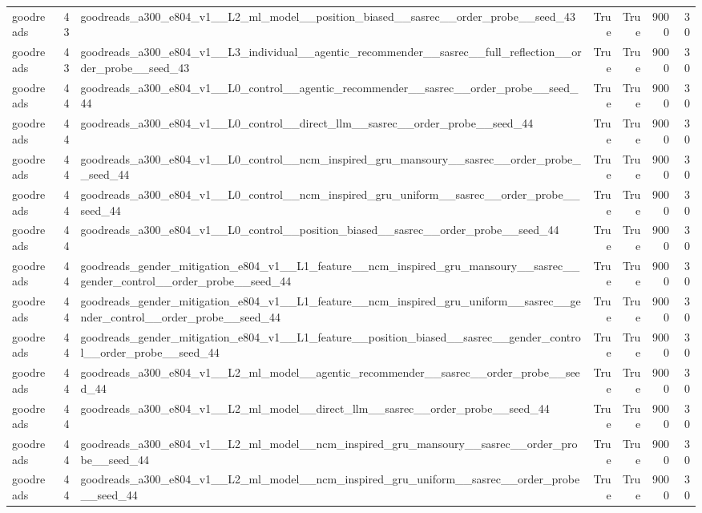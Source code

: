 \begin{table}[htbp!]
\begin{tabular}{lrlrrrr}
goodreads & 43 & goodreads\_a300\_e804\_v1\_\_L2\_ml\_model\_\_position\_biased\_\_sasrec\_\_order\_probe\_\_seed\_43 & True & True & 9000 & 30 \\
goodreads & 43 & goodreads\_a300\_e804\_v1\_\_L3\_individual\_\_agentic\_recommender\_\_sasrec\_\_full\_reflection\_\_order\_probe\_\_seed\_43 & True & True & 9000 & 30 \\
goodreads & 44 & goodreads\_a300\_e804\_v1\_\_L0\_control\_\_agentic\_recommender\_\_sasrec\_\_order\_probe\_\_seed\_44 & True & True & 9000 & 30 \\
goodreads & 44 & goodreads\_a300\_e804\_v1\_\_L0\_control\_\_direct\_llm\_\_sasrec\_\_order\_probe\_\_seed\_44 & True & True & 9000 & 30 \\
goodreads & 44 & goodreads\_a300\_e804\_v1\_\_L0\_control\_\_ncm\_inspired\_gru\_mansoury\_\_sasrec\_\_order\_probe\_\_seed\_44 & True & True & 9000 & 30 \\
goodreads & 44 & goodreads\_a300\_e804\_v1\_\_L0\_control\_\_ncm\_inspired\_gru\_uniform\_\_sasrec\_\_order\_probe\_\_seed\_44 & True & True & 9000 & 30 \\
goodreads & 44 & goodreads\_a300\_e804\_v1\_\_L0\_control\_\_position\_biased\_\_sasrec\_\_order\_probe\_\_seed\_44 & True & True & 9000 & 30 \\
goodreads & 44 & goodreads\_gender\_mitigation\_e804\_v1\_\_L1\_feature\_\_ncm\_inspired\_gru\_mansoury\_\_sasrec\_\_gender\_control\_\_order\_probe\_\_seed\_44 & True & True & 9000 & 30 \\
goodreads & 44 & goodreads\_gender\_mitigation\_e804\_v1\_\_L1\_feature\_\_ncm\_inspired\_gru\_uniform\_\_sasrec\_\_gender\_control\_\_order\_probe\_\_seed\_44 & True & True & 9000 & 30 \\
goodreads & 44 & goodreads\_gender\_mitigation\_e804\_v1\_\_L1\_feature\_\_position\_biased\_\_sasrec\_\_gender\_control\_\_order\_probe\_\_seed\_44 & True & True & 9000 & 30 \\
goodreads & 44 & goodreads\_a300\_e804\_v1\_\_L2\_ml\_model\_\_agentic\_recommender\_\_sasrec\_\_order\_probe\_\_seed\_44 & True & True & 9000 & 30 \\
goodreads & 44 & goodreads\_a300\_e804\_v1\_\_L2\_ml\_model\_\_direct\_llm\_\_sasrec\_\_order\_probe\_\_seed\_44 & True & True & 9000 & 30 \\
goodreads & 44 & goodreads\_a300\_e804\_v1\_\_L2\_ml\_model\_\_ncm\_inspired\_gru\_mansoury\_\_sasrec\_\_order\_probe\_\_seed\_44 & True & True & 9000 & 30 \\
goodreads & 44 & goodreads\_a300\_e804\_v1\_\_L2\_ml\_model\_\_ncm\_inspired\_gru\_uniform\_\_sasrec\_\_order\_probe\_\_seed\_44 & True & True & 9000 & 30 \\

\end{tabular}
\end{table}
